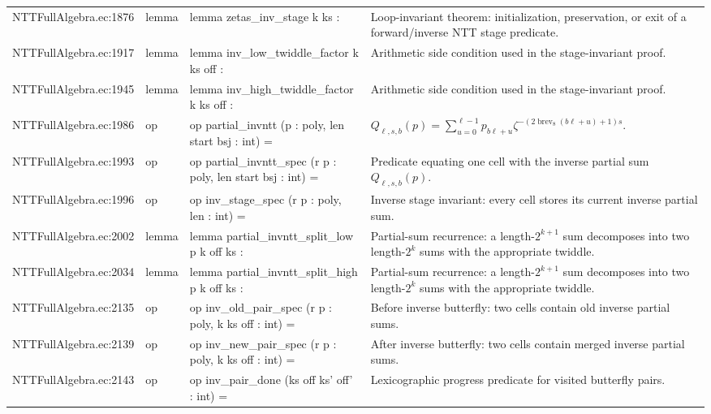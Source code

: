 \documentclass[10pt]{article}
\begin{document}
\begin{longtable}{L{0.11\textwidth}L{0.05\textwidth}L{0.38\textwidth}L{0.42\textwidth}}
NTTFullAlgebra.\allowbreak{}ec:\allowbreak{}1876 & lemma & {\ttfamily\scriptsize lemma zetas\_inv\_stage k ks :} & Loop-invariant theorem: initialization, preservation, or exit of a forward/inverse NTT stage predicate. \\
NTTFullAlgebra.\allowbreak{}ec:\allowbreak{}1917 & lemma & {\ttfamily\scriptsize lemma inv\_low\_twiddle\_factor k ks off :} & Arithmetic side condition used in the stage-invariant proof. \\
NTTFullAlgebra.\allowbreak{}ec:\allowbreak{}1945 & lemma & {\ttfamily\scriptsize lemma inv\_high\_twiddle\_factor k ks off :} & Arithmetic side condition used in the stage-invariant proof. \\
NTTFullAlgebra.\allowbreak{}ec:\allowbreak{}1986 & op & {\ttfamily\scriptsize op partial\_invntt (p : poly, len start bsj : int) =} & $Q_{\ell,s,b}(p)=\sum_{u=0}^{\ell-1}p_{b\ell+u}\zeta^{-(2\operatorname{brev}_8(b\ell+u)+1)s}$. \\
NTTFullAlgebra.\allowbreak{}ec:\allowbreak{}1993 & op & {\ttfamily\scriptsize op partial\_invntt\_spec (r p : poly, len start bsj : int) =} & Predicate equating one cell with the inverse partial sum $Q_{\ell,s,b}(p)$. \\
NTTFullAlgebra.\allowbreak{}ec:\allowbreak{}1996 & op & {\ttfamily\scriptsize op inv\_stage\_spec (r p : poly, len : int) =} & Inverse stage invariant: every cell stores its current inverse partial sum. \\
NTTFullAlgebra.\allowbreak{}ec:\allowbreak{}2002 & lemma & {\ttfamily\scriptsize lemma partial\_invntt\_split\_low p k off ks :} & Partial-sum recurrence: a length-$2^{k+1}$ sum decomposes into two length-$2^k$ sums with the appropriate twiddle. \\
NTTFullAlgebra.\allowbreak{}ec:\allowbreak{}2034 & lemma & {\ttfamily\scriptsize lemma partial\_invntt\_split\_high p k off ks :} & Partial-sum recurrence: a length-$2^{k+1}$ sum decomposes into two length-$2^k$ sums with the appropriate twiddle. \\
NTTFullAlgebra.\allowbreak{}ec:\allowbreak{}2135 & op & {\ttfamily\scriptsize op inv\_old\_pair\_spec (r p : poly, k ks off : int) =} & Before inverse butterfly: two cells contain old inverse partial sums. \\
NTTFullAlgebra.\allowbreak{}ec:\allowbreak{}2139 & op & {\ttfamily\scriptsize op inv\_new\_pair\_spec (r p : poly, k ks off : int) =} & After inverse butterfly: two cells contain merged inverse partial sums. \\
NTTFullAlgebra.\allowbreak{}ec:\allowbreak{}2143 & op & {\ttfamily\scriptsize op inv\_pair\_done (ks off ks' off' : int) =} & Lexicographic progress predicate for visited butterfly pairs. \\

\end{longtable}
\end{document}
